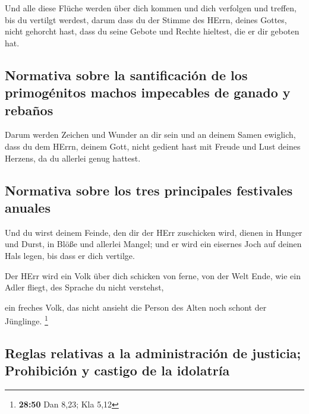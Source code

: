  Und alle diese Flüche werden über dich kommen und dich
verfolgen und treffen, bis du vertilgt werdest, darum dass du der Stimme
des HErrn, deines Gottes, nicht gehorcht hast, dass du seine Gebote und
Rechte hieltest, die er dir geboten hat.

\hypertarget{normativa-sobre-la-santificaciuxf3n-de-los-primoguxe9nitos-machos-impecables-de-ganado-y-rebauxf1os}{%
\subsection{Normativa sobre la santificación de los primogénitos machos
impecables de ganado y
rebaños}\label{normativa-sobre-la-santificaciuxf3n-de-los-primoguxe9nitos-machos-impecables-de-ganado-y-rebauxf1os}}

 Darum werden Zeichen und Wunder an dir sein und an
deinem Samen ewiglich,  dass du dem HErrn, deinem Gott,
nicht gedient hast mit Freude und Lust deines Herzens, da du allerlei
genug hattest.

\hypertarget{normativa-sobre-los-tres-principales-festivales-anuales}{%
\subsection{Normativa sobre los tres principales festivales
anuales}\label{normativa-sobre-los-tres-principales-festivales-anuales}}

 Und du wirst deinem Feinde, den dir der HErr zuschicken
wird, dienen in Hunger und Durst, in Blöße und allerlei Mangel; und er
wird ein eisernes Joch auf deinen Hals legen, bis dass er dich vertilge.

 Der HErr wird ein Volk über dich schicken von ferne, von
der Welt Ende, wie ein Adler fliegt, des Sprache du nicht verstehst,

 ein freches Volk, das nicht ansieht die Person des Alten
noch schont der Jünglinge. \footnote{\textbf{28:50} Dan 8,23; Kla 5,12}

\hypertarget{reglas-relativas-a-la-administraciuxf3n-de-justicia-prohibiciuxf3n-y-castigo-de-la-idolatruxeda}{%
\subsection{Reglas relativas a la administración de justicia;
Prohibición y castigo de la
idolatría}\label{reglas-relativas-a-la-administraciuxf3n-de-justicia-prohibiciuxf3n-y-castigo-de-la-idolatruxeda}}

